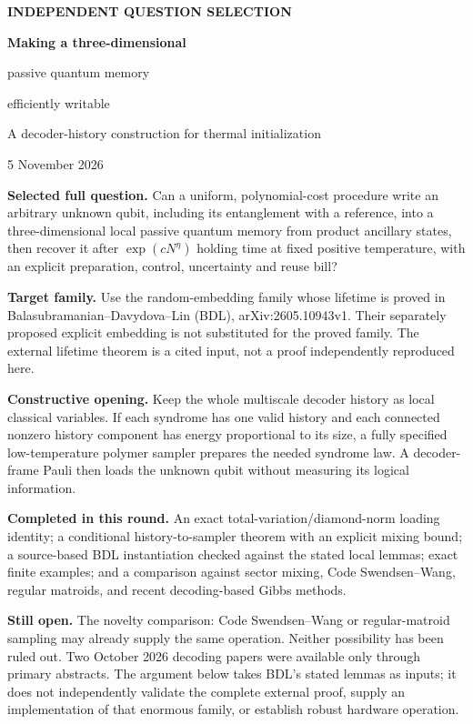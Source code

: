 \documentclass[11pt,a4paper]{article}
\begin{document}
\thispagestyle{empty}
{\small\bfseries\color{accent}INDEPENDENT QUESTION SELECTION}\par
\vspace{4mm}
{\Huge\bfseries\color{ink}Making a three-dimensional\par passive quantum memory\par efficiently writable}\par
\vspace{4mm}
{\Large A decoder-history construction for thermal initialization}\par
\vspace{4mm}
{\large 5 November 2026}\par
\vspace{5mm}
\colorbox{pale}{\parbox{0.94\linewidth}{\textbf{Selected full question.} Can a uniform, polynomial-cost procedure write an arbitrary unknown qubit, including its entanglement with a reference, into a three-dimensional local passive quantum memory from product ancillary states, then recover it after $\exp(cN^\eta)$ holding time at fixed positive temperature, with an explicit preparation, control, uncertainty and reuse bill?}}
\vspace{4mm}

\textbf{Target family.} Use the random-embedding family whose lifetime is proved in Balasubramanian--Davydova--Lin (BDL), arXiv:2605.10943v1. Their separately proposed explicit embedding is not substituted for the proved family. The external lifetime theorem is a cited input, not a proof independently reproduced here.\cite{bdl}

\textbf{Constructive opening.} Keep the whole multiscale decoder history as local classical variables. If each syndrome has one valid history and each connected nonzero history component has energy proportional to its size, a fully specified low-temperature polymer sampler prepares the needed syndrome law. A decoder-frame Pauli then loads the unknown qubit without measuring its logical information.

\textbf{Completed in this round.} An exact total-variation/diamond-norm loading identity; a conditional history-to-sampler theorem with an explicit mixing bound; a source-based BDL instantiation checked against the stated local lemmas; exact finite examples; and a comparison against sector mixing, Code Swendsen--Wang, regular matroids, and recent decoding-based Gibbs methods.

\textbf{Still open.} The novelty comparison: Code Swendsen--Wang or regular-matroid sampling may already supply the same operation. Neither possibility has been ruled out. Two October 2026 decoding papers were available only through primary abstracts. The argument below takes BDL's stated lemmas as inputs; it does not independently validate the complete external proof, supply an implementation of that enormous family, or establish robust hardware operation.
\end{document}
